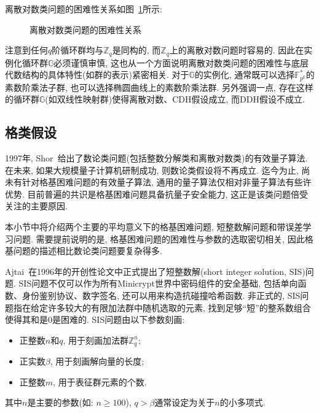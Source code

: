 离散对数类问题的困难性关系如图~\ref{figure:dlog-type-problems-relation}所示: 
\begin{figure}[!hbtp]
\begin{center}
\end{center}
\caption{离散对数类问题的困难性关系}\label{figure:dlog-type-problems-relation}
\end{figure}

\begin{remark}
注意到任何$q$阶循环群均与$\mathbb{Z}_q$是同构的, 而$\mathbb{Z}_q$上的离散对数问题时容易的. 
因此在实例化循环群$\mathbb{G}$必须谨慎审慎, 这也从一个方面说明离散对数类问题的困难性与底层代数结构的具体特性(如群的表示)紧密相关. 
对于$\mathbb{G}$的实例化, 通常既可以选择$\mathbb{F}_{p^k}^*$的素数阶乘法子群, 
也可以选择椭圆曲线上的素数阶乘法群. 
另外强调一点, 存在这样的循环群$\mathbb{G}$(如双线性映射群)使得离散对数、CDH假设成立, 而DDH假设不成立. 
\end{remark}


\subsection{格类假设} 
1997年, Shor~\cite{Shor-SIAM-1997}给出了数论类问题(包括整数分解类和离散对数类)的有效量子算法. 
在未来, 如果大规模量子计算机研制成功, 则数论类假设将不再成立. 迄今为止, 尚未有针对格基困难问题的有效量子算法, 
通用的量子算法仅相对非量子算法有些许优势. 目前普遍的共识是格基困难问题具备抗量子安全能力, 这正是该类问题倍受关注的主要原因. 

本小节中将介绍两个主要的平均意义下的格基困难问题, 短整数解问题和带误差学习问题. 
需要提前说明的是, 格基困难问题的困难性与参数的选取密切相关, 因此格基问题的描述相比数论类问题要复杂得多. 

Ajtai~\cite{Ajtai-STOC-1996}在1996年的开创性论文中正式提出了短整数解(short integer solution, SIS)问题. 
SIS问题不仅可以作为所有Minicrypt世界中密码组件的安全基础, 包括单向函数、身份鉴别协议、数字签名, 
还可以用来构造抗碰撞哈希函数. 非正式的, SIS问题指在给定许多较大的有限加法群中随机选取的元素, 找到足够``短''的整系数组合使得其和是0是困难的. 
SIS问题由以下参数刻画:    
\begin{itemize}
	\item 正整数$n$和$q$, 用于刻画加法群$\mathbb{Z}_q^n$; 
	\item 正实数$\beta$, 用于刻画解向量的长度; 
	\item 正整数$m$, 用于表征群元素的个数. 
\end{itemize}
其中$n$是主要的参数(如: $n \geq 100$), $q > \beta$通常设定为关于$n$的小多项式. 

